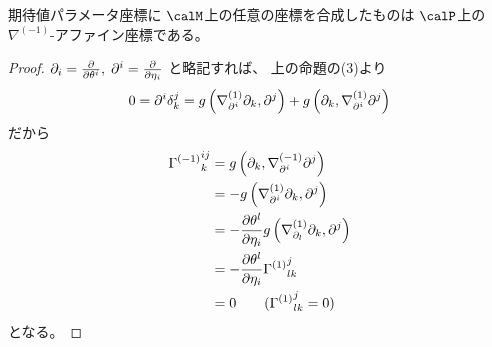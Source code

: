 \documentclass[report]{jlreq}
\begin{document}
\begin{theorem}
    期待値パラメータ座標に
    $\calM$上の任意の座標を合成したものは
    $\calP$上の$\nabla^{(-1)}$-アファイン座標である。
\end{theorem}

\begin{proof}
    $\del_i = \deldel{\theta^i}, \; \del^i = \deldel{\eta_i}$
    と略記すれば、
    上の命題の(3)より
    \begin{alignat}{1}
        0
            =
                \partial^i \delta_k^j
            =
                g\left({
                    \nabla^{(1)}_{\partial^i} \partial_k,
                    \partial^j
                }\right)
                + g\left({
                    \partial_k,
                    \nabla^{(1)}_{\partial^i} \partial^j
                }\right)
    \end{alignat}
    だから
    \begin{alignat}{1}
        {\Gamma^{(-1)}}_k^{ij}
            &=
                g\myparen{
                    \del_k,
                    \nabla^{(-1)}_{\del^i} \del^j
                }
                \\
            &=
                -g\myparen{
                    \nabla^{(1)}_{\del^i} \del_k,
                    \del^j
                }
                \\
            &=
                - \deldel[\theta^l]{\eta_i}
                g\myparen{
                    \nabla^{(1)}_{\del_l} \del_k,
                    \del^j
                }
                \\
            &=
                - \deldel[\theta^l]{\eta_i}
                {\Gamma^{(1)}}_{lk}^j
                \\
            &=
                0
                \qquad
                ({\Gamma^{(1)}}_{lk}^j = 0)
    \end{alignat}
    となる。
\end{proof}

\begin{example}
\end{example}
\end{document}
